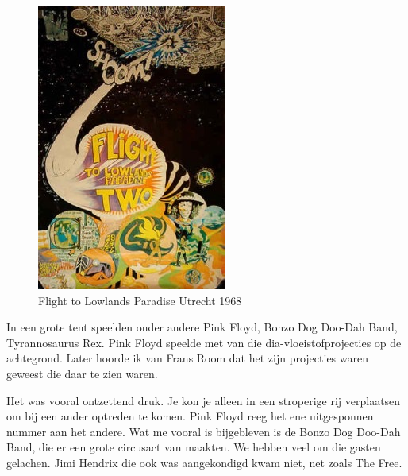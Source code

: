 \documentclass[10pt,twoside, openright]{memoir}
\begin{document}
\begin{figure}
\includegraphics[width=\textwidth]{img/ch31/posterkleur68235}
\caption*{\footnotesize Flight to Lowlands Paradise Utrecht 1968}
\end{figure}

In een grote tent speelden onder andere Pink Floyd, Bonzo Dog Doo-Dah Band, Tyrannosaurus Rex. Pink Floyd speelde met van die dia-vloeistofprojecties op de achtegrond. Later hoorde ik van Frans Room dat het zijn projecties waren geweest die daar te zien waren.

Het was vooral ontzettend druk. Je kon je alleen in een stroperige rij verplaatsen om bij een ander optreden te komen. 
Pink Floyd reeg het ene uitgesponnen nummer aan het andere. Wat me vooral is bijgebleven is de Bonzo Dog Doo-Dah Band, die er een grote circusact van maakten. We hebben veel om die gasten gelachen. Jimi Hendrix die ook was aangekondigd kwam niet, net zoals The Free.
\end{document}
